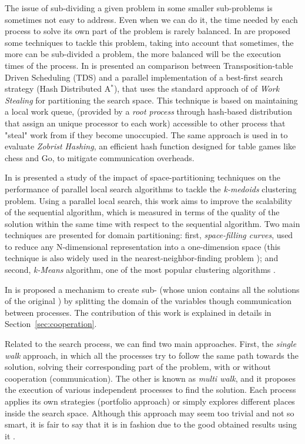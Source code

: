 The issue of sub-dividing a given problem in some smaller sub-problems is sometimes not easy to address. Even when we can do it, the time needed by each process to solve its own part of the problem is rarely balanced. In \cite{Rezgui2013} are proposed some techniques to tackle this problem, taking into account that sometimes, the more can be sub-divided a problem, the more balanced will be the execution times of the process. In \cite{Kishimoto2013} is presented an comparison between Transposition-table Driven Scheduling (TDS) and a parallel implementation of a best-first search strategy (Hash Distributed A$^*$), that uses the standard approach of of \textit{Work Stealing} for partitioning the search space. This technique is based on maintaining a local work queue, (provided by a \textit{root process} through hash-based distribution that assign an unique processor to each work) accessible to other process that "steal" work from if they become unoccupied. The same approach is used in \cite{Jinnai} to evaluate \textit{Zobrist Hashing}, an efficient hash function designed for table games like chess and Go, to mitigate communication overheads.

In \cite{Arbelaez2012} is presented a study of the impact of space-partitioning techniques on the performance of parallel local search algorithms to tackle the \textit{k-medoids} clustering problem. Using a parallel local search, this work aims to improve the scalability of the sequential algorithm, which is measured in terms of the quality of the solution within the same time with respect to the sequential algorithm. Two main techniques are presented for domain partitioning: first, {\it space-filling curves}, used to reduce any N-dimensional representation into a one-dimension space (this technique is also widely used in the nearest-neighbor-finding problem \cite{Chen2005}); and second, {\it k-Means} algorithm, one of the most popular clustering algorithms \cite{Berkhin2002}.

In \cite{Arbab2000} is proposed a mechanism to create sub-\csps{} (whose union contains all the solutions of the original \csp) by splitting the domain of the variables though communication between processes. The contribution of this work is explained in details in Section~\ref{sec:cooperation}.

Related to the search process, we can find two main approaches. First, the {\it single walk} approach, in which all the processes try to follow the same path towards the solution, solving their corresponding part of the problem, with or without cooperation (communication). The other is known as {\it multi walk}, and it proposes the execution of various independent processes to find the solution. Each process applies its own strategies (portfolio approach) or simply explores different places inside the search space. Although this approach may seem too trivial and not so smart, it is fair to say that it is in fashion due to the good obtained results using it \cite{Diaz}.

